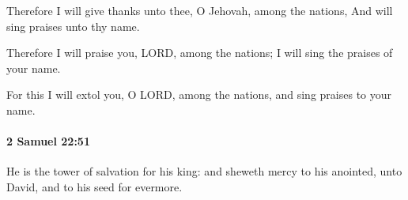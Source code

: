 			\begin{versebox}
					\item[BHS] 
					\item[ASV] Therefore I will give thanks unto thee, O Jehovah, among the nations, And will sing praises unto thy name.
					\item[NIV] Therefore I will praise you, LORD, among the nations; I will sing the praises of your name.
					\item[NRSV] For this I will extol you, O LORD, among the nations, and sing praises to your name.
			\end{versebox}

		\paragraph{2 Samuel 22:51} %
			\label{2SAMUEL-22-51}

			He is the tower of salvation for his king: and sheweth mercy to his anointed, unto David, and to his seed for evermore.

